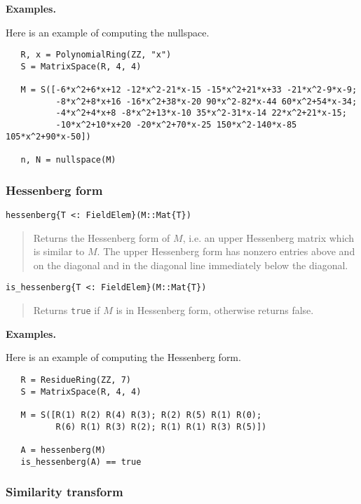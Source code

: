 \documentclass[a4paper,10pt]{article}
\newcommand{\code}{\lstinline}
\newcommand{\desc}[1]{\vspace{-3mm}\begin{quote}#1\end{quote}}
\begin{document}
\textbf{Examples.}

Here is an example of computing the nullspace.

\begin{lstlisting}
   R, x = PolynomialRing(ZZ, "x")
   S = MatrixSpace(R, 4, 4)
   
   M = S([-6*x^2+6*x+12 -12*x^2-21*x-15 -15*x^2+21*x+33 -21*x^2-9*x-9;
          -8*x^2+8*x+16 -16*x^2+38*x-20 90*x^2-82*x-44 60*x^2+54*x-34;
          -4*x^2+4*x+8 -8*x^2+13*x-10 35*x^2-31*x-14 22*x^2+21*x-15;
          -10*x^2+10*x+20 -20*x^2+70*x-25 150*x^2-140*x-85 105*x^2+90*x-50])
   
   n, N = nullspace(M)
\end{lstlisting}

\subsubsection{Hessenberg form}

\begin{lstlisting}
hessenberg{T <: FieldElem}(M::Mat{T})
\end{lstlisting}

\desc{Returns the Hessenberg form of $M$, i.e. an upper Hessenberg matrix
which is similar to $M$. The upper Hessenberg form has nonzero entries
above and on the diagonal and in the diagonal line immediately below the
diagonal.}

\begin{lstlisting}
is_hessenberg{T <: FieldElem}(M::Mat{T})
\end{lstlisting}

\desc{Returns \code{true} if $M$ is in Hessenberg form, otherwise returns
false.}

\textbf{Examples.}

Here is an example of computing the Hessenberg form.

\begin{lstlisting}
   R = ResidueRing(ZZ, 7)
   S = MatrixSpace(R, 4, 4)
   
   M = S([R(1) R(2) R(4) R(3); R(2) R(5) R(1) R(0);
          R(6) R(1) R(3) R(2); R(1) R(1) R(3) R(5)])
   
   A = hessenberg(M)
   is_hessenberg(A) == true
\end{lstlisting}

\subsubsection{Similarity transform}
\end{document}
